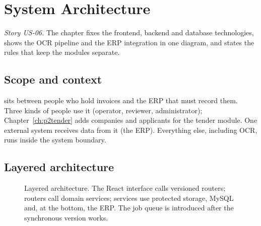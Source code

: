 \chapter{System Architecture}\label{ch:p2arch}
\emph{Story US-06.} The chapter fixes the frontend, backend and database technologies, shows the OCR pipeline and the ERP integration in one diagram, and states the rules that keep the modules separate.

\section{Scope and context}
\projname{} sits between people who hold invoices and the ERP that must record them. Three kinds of people use it (operator, reviewer, administrator); Chapter~\ref{ch:p2tender} adds companies and applicants for the tender module. One external system receives data from it (the ERP). Everything else, including OCR, runs inside the system boundary.

\section{Layered architecture}
\begin{figure}[H]\centering
\resizebox{\textwidth}{!}{}
\caption{Layered architecture. The React interface calls versioned routers; routers call domain services; services use protected storage, MySQL and, at the bottom, the ERP. The job queue is introduced after the synchronous version works.}\label{fig:p2arch}
\end{figure}


